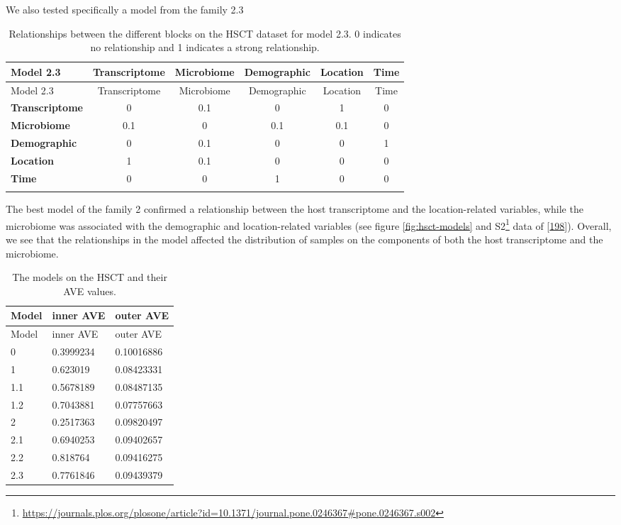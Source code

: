 \documentclass[
  a4paper,
]{book}
\DeclareRobustCommand{\href}[2]{#2\footnote{\url{#1}}}
\begin{document}
We also tested specifically a model from the family 2.3

\begin{longtable}[]{@{}lccccc@{}}
\caption{\label{tab:hsct-model2-3} Relationships between the different blocks on the HSCT dataset for model 2.3. 0 indicates no relationship and 1 indicates a strong relationship.}\tabularnewline
\toprule
Model 2.3 & Transcriptome & Microbiome & Demographic & Location & Time \\
\midrule
\endfirsthead
\toprule
Model 2.3 & Transcriptome & Microbiome & Demographic & Location & Time \\
\midrule
\endhead
\textbf{Transcriptome} & 0 & 0.1 & 0 & 1 & 0 \\
\textbf{Microbiome} & 0.1 & 0 & 0.1 & 0.1 & 0 \\
\textbf{Demographic} & 0 & 0.1 & 0 & 0 & 1 \\
\textbf{Location} & 1 & 0.1 & 0 & 0 & 0 \\
\textbf{Time} & 0 & 0 & 1 & 0 & 0 \\
& & & & & \\
\bottomrule
\end{longtable}

The best model of the family 2 confirmed a relationship between the host transcriptome and the location-related variables, while the microbiome was associated with the demographic and location-related variables (see figure \ref{fig:hsct-models} and \href{https://journals.plos.org/plosone/article?id=10.1371/journal.pone.0246367\#pone.0246367.s002}{S2} data of {[}\protect\hyperlink{ref-revilla2021}{198}{]}).
Overall, we see that the relationships in the model affected the distribution of samples on the components of both the host transcriptome and the microbiome.

\begin{longtable}[]{@{}lll@{}}
\caption{\label{tab:hsct-models-ave} The models on the HSCT and their AVE values.}\tabularnewline
\toprule
Model & inner AVE & outer AVE \\
\midrule
\endfirsthead
\toprule
Model & inner AVE & outer AVE \\
\midrule
\endhead
0 & 0.3999234 & 0.10016886 \\
1 & 0.623019 & 0.08423331 \\
1.1 & 0.5678189 & 0.08487135 \\
1.2 & 0.7043881 & 0.07757663 \\
2 & 0.2517363 & 0.09820497 \\
2.1 & 0.6940253 & 0.09402657 \\
2.2 & 0.818764 & 0.09416275 \\
2.3 & 0.7761846 & 0.09439379 \\
\bottomrule
\end{longtable}
\end{document}
